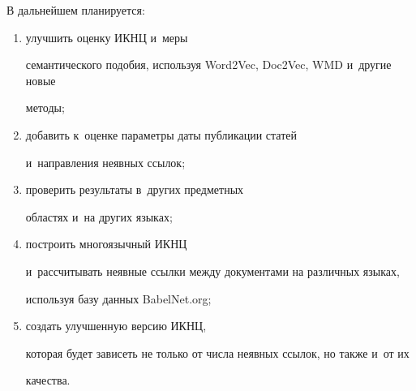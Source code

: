  


  В дальнейшем планируется: 


  \begin{enumerate}[(1)]


  \item улучшить оценку ИКНЦ и~меры 


семантического подобия, используя Word2Vec, Doc2Vec, WMD и~другие новые 


методы; 


\item добавить к~оценке параметры даты публикации статей 


и~направления неявных ссылок; 


\item проверить результаты в~других предметных 


областях и~на других языках; 


\item построить многоязычный ИКНЦ 


и~рассчитывать неявные ссылки между документами на различных языках, 


используя базу данных BabelNet.org; 


\item создать улучшенную версию ИКНЦ, 


которая будет зависеть не только от числа неявных ссылок, но также и~от их 


качества.


\end{enumerate}


  


